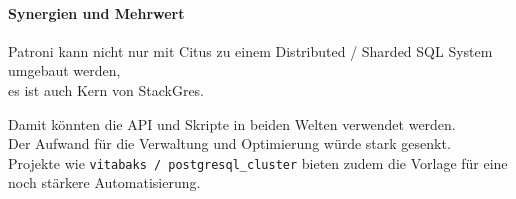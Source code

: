 \begin{flushleft}
    \paragraph{Synergien und Mehrwert}
    Patroni kann nicht nur mit Citus zu einem Distributed / Sharded SQL System umgebaut werden,\\
    es ist auch Kern von StackGres.
\end{flushleft}
\begin{flushleft}
    Damit könnten die API und Skripte in beiden Welten verwendet werden.\\
    Der Aufwand für die Verwaltung und Optimierung würde stark gesenkt.\\
    Projekte wie \texttt{vitabaks / postgresql\_cluster}\cite{HIQVBEPF} bieten zudem die Vorlage für eine noch stärkere Automatisierung.
\end{flushleft}